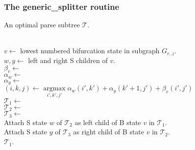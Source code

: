 \documentclass[11pt]{article}
\def\argmax{\mathop{\mathrm{argmax}}\limits}
\begin{document}
\subsubsection{The generic\_splitter routine}
\begin{algorithm}
         {An optimal parse subtree $\mathcal{T}$.}

\begin{algtab*}
  \algreturn {}\\
\algelse
   $v   \leftarrow$ lowest numbered bifurcation state in subgraph $G_{r..z}$.\\
   $w,y \leftarrow$ left and right S children of $v$.\\
   $\beta_v \leftarrow$  \\
   $\alpha_w \leftarrow$ \\
   $\alpha_y \leftarrow$ \\

   $(i,k,j) \leftarrow \argmax_{i',k',j'} \alpha_w(i',k') + \alpha_y(k'+1,j') + \beta_v(i',j')$ \\

   $\mathcal{T}_1   \leftarrow$ \\
   $\mathcal{T}_2 \leftarrow$ \\
   $\mathcal{T}_3 \leftarrow$ \\

   Attach S state $w$ of $\mathcal{T}_2$ as left child of B state $v$ in $\mathcal{T}_1$.\\
   Attach S state $y$ of $\mathcal{T}_3$ as right child of B state $v$ in $\mathcal{T}_2$.\\
  
   \algreturn $\mathcal{T}_1$.\\
\algend
\end{algtab*}
\end{algorithm}
\end{document}
